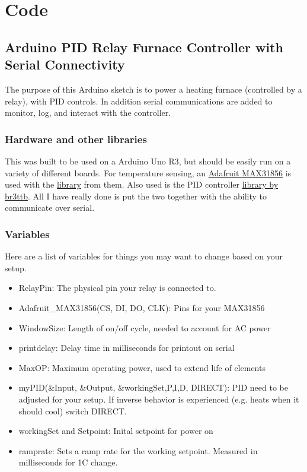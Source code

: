 

\chapter{Code}

\section{Arduino PID Relay Furnace Controller with Serial
Connectivity}\label{arduino-pid-relay-furnace-controller-with-serial-connectivity}

The purpose of this Arduino sketch is to power a heating furnace
(controlled by a relay), with PID controls. In addition serial
communications are added to monitor, log, and interact with the
controller.

\subsection{Hardware and other
libraries}\label{hardware-and-other-libraries}

This was built to be used on a Arduino Uno R3, but should be easily run
on a variety of different boards. For temperature sensing, an
\href{https://www.adafruit.com/product/3263}{Adafruit MAX31856} is used
with the \href{https://github.com/adafruit/Adafruit_MAX31856}{library}
from them. Also used is the PID controller
\href{https://github.com/br3ttb/Arduino-PID-Library}{library by br3ttb}.
All I have really done is put the two together with the ability to
communicate over serial.

\subsection{Variables}\label{variables}

Here are a list of variables for things you may want to change based on
your setup.

\begin{itemize}
\item
  RelayPin: The physical pin your relay is connected to.
\item
  Adafruit\_MAX31856(CS, DI, DO, CLK): Pins for your MAX31856
\item
  WindowSize: Length of on/off cycle, needed to account for AC power
\item
  printdelay: Delay time in milliseconds for printout on serial
\item
  MaxOP: Maximum operating power, used to extend life of elements
\item
  myPID(\&Input, \&Output, \&workingSet,P,I,D, DIRECT): PID need to be adjusted for your setup.
  If inverse behavior is experienced (e.g. heats when it should cool) switch DIRECT.
\item
  workingSet and Setpoint: Inital setpoint for power on
\item
  ramprate: Sets a ramp rate for the working setpoint. Measured in
  milliseconds for 1C change.
\end{itemize}

